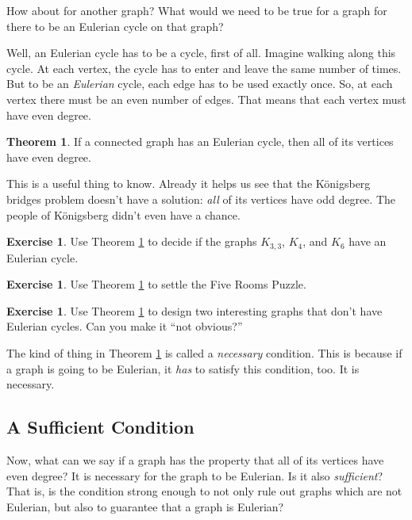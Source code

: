 \documentclass[12pt,letterpaper]{article}
\theoremstyle{definition}
\newtheorem{exercise}[question]{Exercise}
\newtheorem*{theorem}{Theorem}
\begin{document}
How about for another graph?  What would we need to be true for a graph for 
there to be an Eulerian cycle on that graph?

Well, an Eulerian cycle has to be a cycle, first of all. Imagine walking along this cycle. At each vertex, 
the cycle has to enter and leave the same number of times. But to be an \emph{Eulerian} cycle, each 
edge has to be used exactly once. So, at each vertex there must be an even number of edges. That
means that each vertex must have even degree.

\begin{theorem}\label{thm:necessary} 
If a connected graph has an Eulerian cycle, then all of its vertices have even degree.
\end{theorem}

This is a useful thing to know. Already it helps us see that the K\"{o}nigsberg bridges problem
doesn't have a solution: \emph{all} of its vertices have odd degree. The people of K\"{o}nigsberg
didn't even have a chance.

\begin{exercise}
Use Theorem \ref{thm:necessary} to decide if the graphs $K_{3,3}$, $K_4$, and $K_6$ have an Eulerian cycle.
\end{exercise}

\begin{exercise}
Use Theorem \ref{thm:necessary} to settle the Five Rooms Puzzle.
\end{exercise}

\begin{exercise}\label{exercise:try}
Use Theorem \ref{thm:necessary} to design two interesting graphs that don't have Eulerian cycles.
Can you make it ``not obvious?''
\end{exercise}

The kind of thing in Theorem \ref{thm:necessary} is called a \emph{necessary} condition. This is because if
a graph is going to be Eulerian, it \textit{has} to satisfy this condition, too. It is necessary.

\subsection*{A Sufficient Condition}

Now, what can we say if a graph has the property that all of its vertices have even degree? It is necessary for the
graph to be Eulerian. Is it also \emph{sufficient}? That is, is the condition strong enough to not only rule out graphs
which are not Eulerian, but also to guarantee that a graph is Eulerian?
\end{document}
